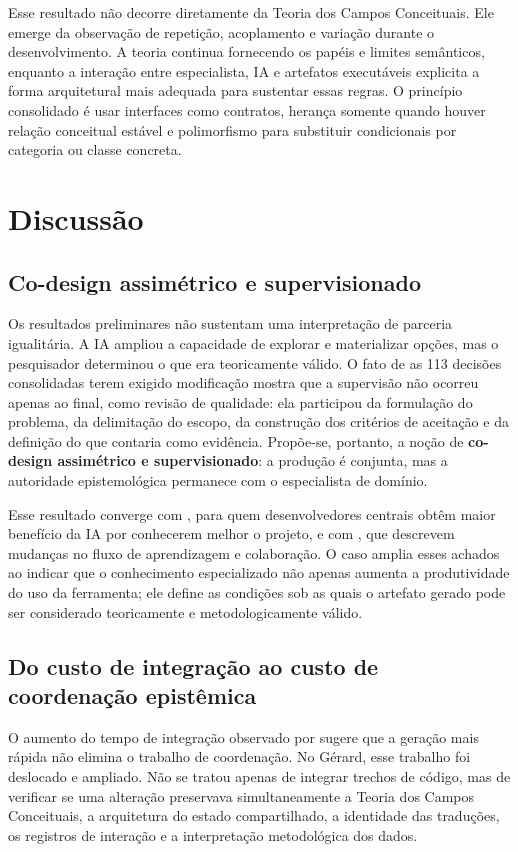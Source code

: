 \documentclass[preprint,12pt,authoryear]{elsarticle}
\newcommand{\gerard}{Gérard\xspace}
\begin{document}
Esse resultado não decorre diretamente da Teoria dos Campos Conceituais. Ele emerge da observação de repetição, acoplamento e variação durante o desenvolvimento. A teoria continua fornecendo os papéis e limites semânticos, enquanto a interação entre especialista, IA e artefatos executáveis explicita a forma arquitetural mais adequada para sustentar essas regras. O princípio consolidado é usar interfaces como contratos, herança somente quando houver relação conceitual estável e polimorfismo para substituir condicionais por categoria ou classe concreta.

\section{Discussão}
\subsection{Co-design assimétrico e supervisionado}
Os resultados preliminares não sustentam uma interpretação de parceria igualitária. A IA ampliou a capacidade de explorar e materializar opções, mas o pesquisador determinou o que era teoricamente válido. O fato de as 113 decisões consolidadas terem exigido modificação mostra que a supervisão não ocorreu apenas ao final, como revisão de qualidade: ela participou da formulação do problema, da delimitação do escopo, da construção dos critérios de aceitação e da definição do que contaria como evidência. Propõe-se, portanto, a noção de \textbf{co-design assimétrico e supervisionado}: a produção é conjunta, mas a autoridade epistemológica permanece com o especialista de domínio.

Esse resultado converge com \citet{song2024impact}, para quem desenvolvedores centrais obtêm maior benefício da IA por conhecerem melhor o projeto, e com \citet{ulfsnes2024transforming}, que descrevem mudanças no fluxo de aprendizagem e colaboração. O caso amplia esses achados ao indicar que o conhecimento especializado não apenas aumenta a produtividade do uso da ferramenta; ele define as condições sob as quais o artefato gerado pode ser considerado teoricamente e metodologicamente válido.

\subsection{Do custo de integração ao custo de coordenação epistêmica}
O aumento do tempo de integração observado por \citet{song2024impact} sugere que a geração mais rápida não elimina o trabalho de coordenação. No \gerard, esse trabalho foi deslocado e ampliado. Não se tratou apenas de integrar trechos de código, mas de verificar se uma alteração preservava simultaneamente a Teoria dos Campos Conceituais, a arquitetura do estado compartilhado, a identidade das traduções, os registros de interação e a interpretação metodológica dos dados.
\end{document}
